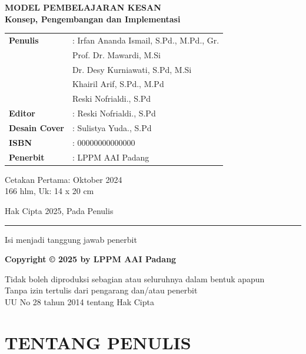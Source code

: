 \documentclass[12pt,a4paper,oneside]{book}
\begin{document}
\fontsize{16pt}{20pt}\selectfont

\begin{titlepage}
\begin{center}
{\Large\textbf{MODEL PEMBELAJARAN KESAN\\Konsep, Pengembangan dan Implementasi}}

\vspace{2cm}

\begin{tabular}{ll}
\textbf{Penulis} & : Irfan Ananda Ismail, S.Pd., M.Pd., Gr.\\
& Prof. Dr. Mawardi, M.Si\\
& Dr. Desy Kurniawati, S.Pd, M.Si\\
& Khairil Arif, S.Pd., M.Pd\\
& Reski Nofrialdi., S.Pd\\[0.5cm]
\textbf{Editor} & : Reski Nofrialdi., S.Pd\\
\textbf{Desain Cover} & : Sulistya Yuda., S.Pd\\
\textbf{ISBN} & : 00000000000000\\
\textbf{Penerbit} & : LPPM AAI Padang\\
\end{tabular}

\vspace{2cm}

Cetakan Pertama: Oktober 2024\\
166 hlm, Uk: 14 x 20 cm

\vspace{1cm}

Hak Cipta 2025, Pada Penulis

\hrule

Isi menjadi tanggung jawab penerbit

\vspace{0.5cm}

{\textbf{Copyright © 2025 by LPPM AAI Padang}}

\vspace{0.5cm}

Tidak boleh diproduksi sebagian atau seluruhnya dalam bentuk apapun\\
Tanpa izin tertulis dari pengarang dan/atau penerbit\\
UU No 28 tahun 2014 tentang Hak Cipta

\end{center}
\end{titlepage}

\chapter*{TENTANG PENULIS}
\end{document}
